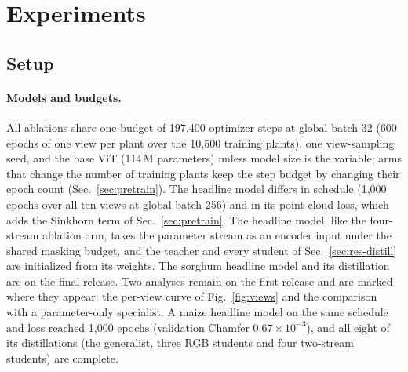 \section{Experiments}
\label{sec:results}

\subsection{Setup}
\label{sec:setup}

\paragraph{Models and budgets.}
All ablations share one budget of 197{,}400 optimizer steps at global batch 32
(600 epochs of one view per plant over the 10{,}500 training plants), one
view-sampling seed, and the base ViT (114\,M parameters) unless model size is
the variable; arms that change the number of training plants keep the step
budget by changing their epoch count (Sec.~\ref{sec:pretrain}). The headline
model differs in schedule (1{,}000 epochs over all ten views at global batch
256) and in its point-cloud loss, which adds the Sinkhorn term of
Sec.~\ref{sec:pretrain}. The headline model, like the four-stream ablation arm,
takes the parameter stream as an encoder input under the shared masking budget,
and the teacher and every student of Sec.~\ref{sec:res-distill} are initialized
from its weights. The sorghum headline model and its distillation are on the
final release. Two analyses remain on the first release and are marked where
they appear: the per-view curve of Fig.~\ref{fig:views} and the comparison with
a parameter-only specialist. A maize headline model on the same schedule and
loss reached 1{,}000 epochs (validation Chamfer $0.67\times10^{-3}$), and all
eight of its distillations (the generalist, three RGB students and four
two-stream students) are complete.

